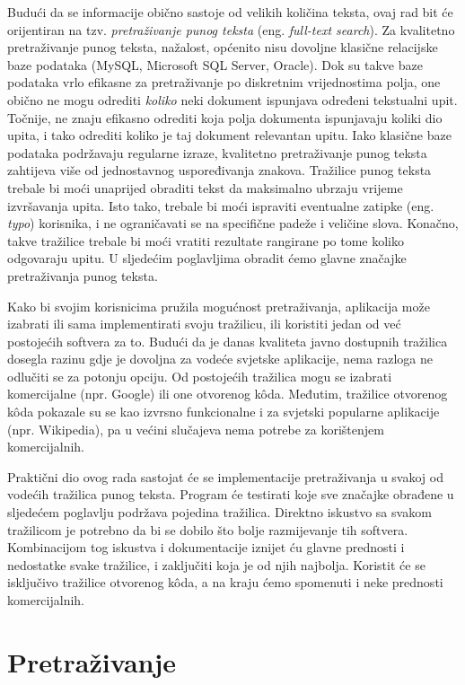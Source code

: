 \documentclass[a4paper,twoside,12pt]{scrreprt}
\begin{document}
Budući da se informacije obično sastoje od velikih količina teksta, ovaj rad bit će orijentiran na tzv. \textit{pretraživanje punog teksta} (eng. \textit{full-text search}). Za kvalitetno pretraživanje punog teksta, nažalost, općenito nisu dovoljne klasične relacijske baze podataka (MySQL, Microsoft SQL Server, Oracle). Dok su takve baze podataka vrlo efikasne za pretraživanje po diskretnim vrijednostima polja, one obično ne mogu odrediti \textit{koliko} neki dokument ispunjava određeni tekstualni upit. Točnije, ne znaju efikasno odrediti koja polja dokumenta ispunjavaju koliki dio upita, i tako odrediti koliko je taj dokument relevantan upitu. Iako klasične baze podataka podržavaju regularne izraze, kvalitetno pretraživanje punog teksta zahtijeva više od jednostavnog uspoređivanja znakova. Tražilice punog teksta trebale bi moći unaprijed obraditi tekst da maksimalno ubrzaju vrijeme izvršavanja upita. Isto tako, trebale bi moći ispraviti eventualne zatipke (eng. \textit{typo}) korisnika, i ne ograničavati se na specifične padeže i veličine slova. Konačno, takve tražilice trebale bi moći vratiti rezultate rangirane po tome koliko odgovaraju upitu. U sljedećim poglavljima obradit ćemo glavne značajke pretraživanja punog teksta.

Kako bi svojim korisnicima pružila mogućnost pretraživanja, aplikacija može izabrati ili sama implementirati svoju tražilicu, ili koristiti jedan od već postojećih softvera za to. Budući da je danas kvaliteta javno dostupnih tražilica dosegla razinu gdje je dovoljna za vodeće svjetske aplikacije, nema razloga ne odlučiti se za potonju opciju. Od postojećih tražilica mogu se izabrati komercijalne (npr. Google) ili one otvorenog kôda. Međutim, tražilice otvorenog kôda pokazale su se kao izvrsno funkcionalne i za svjetski popularne aplikacije (npr. Wikipedia), pa u većini slučajeva nema potrebe za korištenjem komercijalnih.

Praktični dio ovog rada sastojat će se implementacije pretraživanja u svakoj od vodećih tražilica punog teksta. Program će testirati koje sve značajke obrađene u sljedećem poglavlju podržava pojedina tražilica. Direktno iskustvo sa svakom tražilicom je potrebno da bi se dobilo što bolje razmijevanje tih softvera. Kombinacijom tog iskustva i dokumentacije iznijet ću glavne prednosti i nedostatke svake tražilice, i zaključiti koja je od njih najbolja. Koristit će se isključivo tražilice otvorenog kôda, a na kraju ćemo spomenuti i neke prednosti komercijalnih.

\chapter{Pretraživanje} \label{searching}
\end{document}

